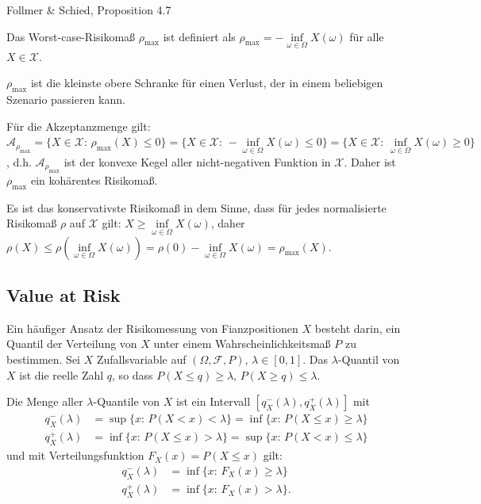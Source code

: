 \documentclass[a4paper,twoside,DIV15,BCOR12mm]{scrbook}
\begin{document}
\begin{beweis}
Follmer \& Schied, Proposition 4.7
\end{beweis}

\begin{beispiel}
Das Worst-case-Risikomaß $\rho_{\max}$ ist definiert als $\rho_{\max}=-\inf\limits_{\omega\in\Omega} X(\omega)$ für alle $X\in\mathcal{X}$.

$\rho_{\max}$ ist die kleinste obere Schranke für einen Verlust, der in einem beliebigen Szenario passieren kann.

Für die Akzeptanzmenge gilt: $\mathcal{A}_{\rho_{\max}}=\{X\in\mathcal{X}:\, \rho_{\max}(X)\leq 0\}=\{X\in\mathcal{X}:\, -\inf\limits_{\omega\in\Omega} X(\omega) \leq 0\}=\{X\in\mathcal{X}:\, \inf\limits_{\omega\in\Omega} X(\omega) \geq 0\}$, d.h. $\mathcal{A}_{\rho_{\max}}$ ist der konvexe Kegel aller nicht-negativen Funktion in $\mathcal{X}$. Daher ist $\rho_{\max}$ ein kohärentes Risikomaß.

Es ist das konservativste Risikomaß in dem Sinne, dass für jedes normalisierte Risikomaß $\rho$ auf $\mathcal{X}$ gilt: $X\geq\inf\limits_{\omega\in\Omega} X(\omega)$, daher $\rho(X)\leq \rho(\inf\limits_{\omega\in\Omega} X(\omega))=\rho(0)-\inf\limits_{\omega\in\Omega} X(\omega)=\rho_{\max}(X)$.
\end{beispiel}

\subsection{Value at Risk}

Ein häufiger Ansatz der Risikomessung von Fianzpositionen $X$ besteht darin, ein Quantil der Verteilung von $X$ unter einem Wahrscheinlichkeitsmaß $ P$ zu bestimmen. Sei $X$ Zufallsvariable auf $(\Omega,\mathcal{F}, P)$, $\lambda\in[0,1]$. Das $\lambda$-Quantil von $X$ ist die reelle Zahl $q$, so dass $ P(X\leq q) \geq \lambda,\,  P(X\geq q) \leq \lambda$.

Die Menge aller $\lambda$-Quantile von $X$ ist ein Intervall $[q_X^-(\lambda),q_X^+(\lambda)]$ mit 
\begin{align*}
q_X^-(\lambda)&=\sup\{x:\,  P(X<x)<\lambda\}=\inf\{x:\,  P(X\leq x)\geq \lambda\} \\
q_X^+(\lambda)&=\inf\{x:\,  P(X\leq x)>\lambda\}=\sup\{x:\,  P(X < x)\leq \lambda\}
\end{align*}
und mit Verteilungsfunktion $F_X(x)= P(X\leq x)$ gilt:
\begin{align*}
q_X^-(\lambda)&=\inf\{x:\, F_X(x)\geq \lambda\}\\
q_X^+(\lambda)&=\inf\{x:\, F_X(x)> \lambda\}.
\end{align*}
\end{document}
